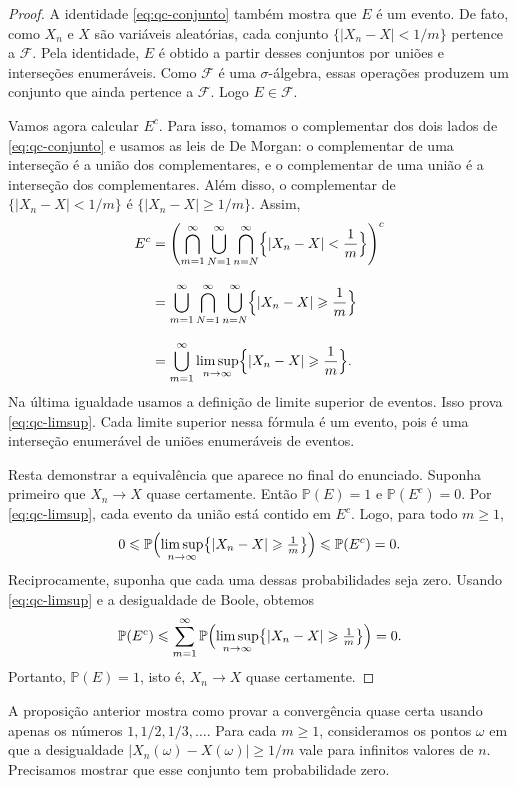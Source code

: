 \documentclass[12pt,portuguese]{article}
\theoremstyle{definition}
\theoremstyle{plainexercise}
\theoremstyle{starredexercise}
\theoremstyle{definition}
\begin{document}
\begin{proof}
\bigskip 

A identidade \eqref{eq:qc-conjunto} também mostra que $E$ é um evento. De fato, como $X_n$ e $X$
são variáveis aleatórias, cada conjunto $\{|X_n-X|<1/m\}$ pertence a
$\mathcal{F}$. Pela identidade, $E$ é obtido a partir desses conjuntos por
uniões e interseções enumeráveis. Como $\mathcal{F}$ é uma $\sigma$-álgebra,
essas operações produzem um conjunto que ainda pertence a $\mathcal{F}$.
Logo $E\in\mathcal{F}$.

Vamos agora calcular $E^c$. Para isso, tomamos o complementar dos dois lados
de \eqref{eq:qc-conjunto} e usamos as leis de De Morgan: o complementar de
uma interseção é a união dos complementares, e o complementar de uma união
é a interseção dos complementares. Além disso, o complementar de
$\{|X_n-X|<1/m\}$ é $\{|X_n-X|\geqslant1/m\}$. Assim,
\begin{align*}
E^c
&=\Biggl(
\bigcap_{m=1}^{\infty}\bigcup_{N=1}^{\infty}\bigcap_{n=N}^{\infty}
\Bigl\{|X_n-X|<\frac{1}{m}\Bigr\}
\Biggr)^c
\\[0.3cm]
&=\bigcup_{m=1}^{\infty}\bigcap_{N=1}^{\infty}\bigcup_{n=N}^{\infty}
\Bigl\{|X_n-X|\geqslant\frac{1}{m}\Bigr\}
\\[0.3cm]
&=\bigcup_{m=1}^{\infty}\limsup_{n\to\infty}
\Bigl\{|X_n-X|\geqslant\frac{1}{m}\Bigr\}.
\end{align*}
Na última igualdade usamos a definição de limite superior de eventos.
Isso prova \eqref{eq:qc-limsup}. Cada limite superior nessa fórmula é um
evento, pois é uma interseção enumerável de uniões enumeráveis de eventos.


\bigskip 


Resta demonstrar a equivalência que aparece no final do enunciado. Suponha
primeiro que $X_n\to X$ quase certamente. Então $\mathbb{P}(E)=1$ e
$\mathbb{P}(E^c)=0$. Por \eqref{eq:qc-limsup}, cada evento da união está
contido em $E^c$. Logo, para todo $m\geqslant1$,
\[
0\leqslant
\mathbb{P}\Bigl(\limsup_{n\to\infty}
\bigl\{|X_n-X|\geqslant\tfrac{1}{m}\bigr\}\Bigr)
\leqslant\mathbb{P}(E^c)=0.
\]
Reciprocamente, suponha que cada uma dessas probabilidades seja zero.
Usando \eqref{eq:qc-limsup} e a desigualdade de Boole, obtemos
\[
\mathbb{P}(E^c)
\leqslant\sum_{m=1}^{\infty}
\mathbb{P}\Bigl(\limsup_{n\to\infty}
\bigl\{|X_n-X|\geqslant\tfrac{1}{m}\bigr\}\Bigr)=0.
\]
Portanto, $\mathbb{P}(E)=1$, isto é, $X_n\to X$ quase certamente.
\end{proof}

A proposição anterior mostra como provar a convergência quase certa usando
apenas os números $1,1/2,1/3,\ldots$. Para cada $m\geqslant1$, consideramos
os pontos $\omega$ em que a desigualdade
$|X_n(\omega)-X(\omega)|\geqslant1/m$ vale para infinitos valores de $n$.
Precisamos mostrar que esse conjunto tem probabilidade zero.
\end{document}
